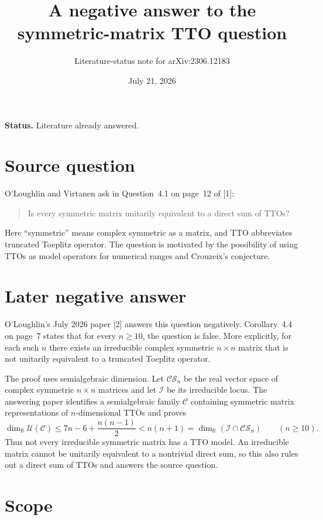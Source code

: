 \documentclass[10pt]{article}
\title{A negative answer to the symmetric-matrix TTO question}
\author{Literature-status note for arXiv:2306.12183}
\date{July 21, 2026}
\begin{document}
\maketitle

\noindent\textbf{Status.} Literature already answered.

\section{Source question}

O'Loughlin and Virtanen ask in Question~4.1 on page~12 of [1]:

\begin{quote}
Is every symmetric matrix unitarily equivalent to a direct sum of TTOs?
\end{quote}

Here ``symmetric'' means complex symmetric as a matrix, and TTO abbreviates
truncated Toeplitz operator.  The question is motivated by the possibility of
using TTOs as model operators for numerical ranges and Crouzeix's conjecture.

\section{Later negative answer}

O'Loughlin's July 2026 paper [2] answers this question negatively.
Corollary~4.4 on page~7 states that for every $n\ge10$, the question is false.
More explicitly, for each such $n$ there exists an irreducible complex
symmetric $n\times n$ matrix that is not unitarily equivalent to a truncated
Toeplitz operator.

The proof uses semialgebraic dimension.  Let $\mathcal{CS}_n$ be the real
vector space of complex symmetric $n\times n$ matrices and let $\mathcal I$
be its irreducible locus.  The answering paper identifies a semialgebraic
family $\mathcal C$ containing symmetric matrix representations of
$n$-dimensional TTOs and proves
\[
 \dim_{\mathbb R}\mathcal U(\mathcal C)
 \le 7n-6+\frac{n(n-1)}2
 < n(n+1)
 =\dim_{\mathbb R}(\mathcal I\cap\mathcal{CS}_n)
 \qquad(n\ge10).
\]
Thus not every irreducible symmetric matrix has a TTO model.  An irreducible
matrix cannot be unitarily equivalent to a nontrivial direct sum, so this also
rules out a direct sum of TTOs and answers the source question.

\section{Scope}
\end{document}
